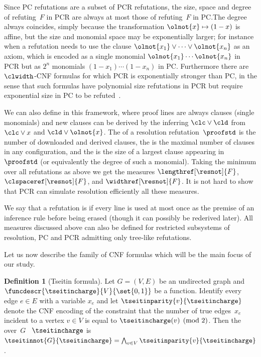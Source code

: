 \documentclass[11pt]{article}
\numberwithin{equation}{section}
\theoremstyle{definition}
\newtheorem{definition}[theorem]{Definition}
\theoremstyle{plain}
\begin{document}
Since PC refutations are a subset of PCR refutations, the size, space
and degree of refuting~$F$ in PCR are always at most those of
refuting~$F$ in PC.\@ The degree always coincides, simply because the
%
%
transformation $\olnot{x} \mapsto (1-x)$ is affine, 
but the size and
monomial space may be exponentially larger; for instance when
a refutation needs to use the clause
$\olnot{x_1}\lor\cdots\lor\olnot{x_n}$ as an axiom, which is encoded
as a single monomial $\olnot{x_1}\cdots\olnot{x_n}$ in PCR but as
$2^n$ monomials $(1-x_1)\cdots(1-x_n)$ in PC.
%
Furthermore there are $\clwidth$-CNF formulas for which PCR is
exponentially stronger than PC, in the sense that such formulas have
polynomial size refutations in PCR but require exponential size in PC to be
%
refuted~\cite{dRLNS21Negative}.

We can also define  in this framework, 
where proof lines are always clauses (\ieComma single monomials)
and new clauses can be derived by the 
inferring
$\clc \lor \cld$
from
$\clc \lor x$
and
$\cld \lor \olnot{x}$.
The  of a resolution refutation~$\proofstd$ is the number
of downloaded and derived clauses, the  is the
maximal number of clauses in any configuration, and the  
 is the size of a largest clause appearing
in~$\proofstd$ (or equivalently the degree of such a monomial). 
Taking the minimum over all refutations as above we
get the measures
$\lengthref[\resnot]{F}$,
$\clspaceref[\resnot]{F}$,
and
$\widthref[\resnot]{F}$.
It is not hard to show that PCR can simulate resolution efficiently
\wrt all these measures.

We say that a refutation is  if every line is
used at most once as  the premise of an inference rule before being
erased (though it can possibly be rederived later). All 
measures
discussed above can also be defined for restricted subsystems of
resolution, PC and PCR admitting only tree-like refutations.

Let us now
describe
%
the family of CNF formulas 
which will be the main focus
of our study.

\begin{definition}[Tseitin formula]
  \label{def:tseitinmod2}
  Let $G = (V,E)$ be an undirected graph and 
  $\funcdescr{\tseitincharge}{V}{\set{0,1}}$ 
  be a function. 
  Identify every edge $e \in E$ with a variable $x_e$
  and  let
  $\tseitinparity{v}{\tseitincharge}$
  denote the CNF encoding
%
  of the constraint
  that the number of true edges~$x_e$ incident to a vertex $v \in V$
  is equal to $\tseitincharge(v) \pmod{2}$.
%
%
%
  Then the  over~$G$ \wrt{}~$\tseitincharge$
  is $\tseitinnot{G}{\tseitincharge}=\bigwedge_{v\in V}\tseitinparity{v}{\tseitincharge}$.
\end{definition}
\end{document}
